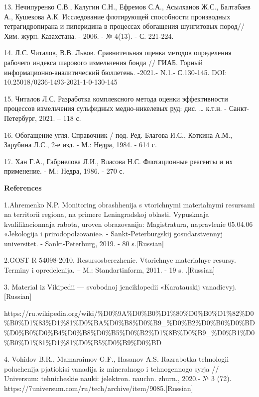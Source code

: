 13. Нечипуренко С.В., Калугин С.Н., Ефремов С.А., Асылханов Ж.С.,
Балтабаев А., Кушекова А.К. Исследование флотирующей способности
производных тетрагидропирана и пиперидина в процессах обогащения
шунгитовых пород// Хим. журн. Казахстана. - 2006. - № 4(13). - С.
221-224.

14. Л.С. Читалов, В.В. Львов. Сравнительная оценка методов определения
рабочего индекса шарового измельчения бонда // ГИАБ. Горный
информационно-аналитический бюллетень. -2021.- N.1.- С.130-145. DOI:
10.25018/0236-1493-2021-1-0-130-145

15. Читалов Л.С. Разработка комплексного метода оценки эффективности
процессов измельчения сульфидных медно-никелевых руд: дис. \ldots{}
к.т.н. - Санкт-Петербург, 2021. -- 118 с.

16. Обогащение угля. Справочник / под. Ред. Благова И.С., Коткина А.М.,
Зарубина Л.С., 2-е изд. - М.: Недра, 1984. - 614 с.

17. Хан Г.А., Габриелова Л.И., Власова Н.С. Флотационные реагенты и их
применение. - М.: Недра, 1986. - 270 с.

\textbf{References}

1.Ahremenko N.P. Monitoring obrashhenija s vtorichnymi
material\textquotesingle nymi resursami na territorii regiona, na
primere Leningradskoj oblasti. Vypusknaja kvalifikacionnaja rabota,
uroven\textquotesingle{} obrazovanija: Magistratura, napravlenie
05.04.06 «Jekologija i prirodopol\textquotesingle zovanie». -
Sankt-Peterburgskij gosudarstvennyj universitet. - Sankt-Peterburg,
2019. - 80 s.{[}Russian{]}

2.GOST R 54098-2010. Resursosberezhenie. Vtorichnye
material\textquotesingle nye resursy. Terminy i opredelenija. -- M.:
Standartinform, 2011. - 19 s. .{[}Russian{]}

3. Material iz Vikipedii --- svobodnoj jenciklopedii «Karatauskij
vanadievyj.{[}Russian{]}

https://ru.wikipedia.org/wiki/\%D0\%9A\%D0\%B0\%D1\%80\%D0\%B0\%D1\%82\%D0\%B0\%D1\%83\%D1\%81\%D0\%BA\%D0\%B8\%D0\%B9\_\%D0\%B2\%D0\%B0\%D0\%BD\%D0\%B0\%D0\%B4\%D0\%B8\%D0\%B5\%D0\%B2\%D1\%8B\%D0\%B9\_\%D0\%B1\%D0\%B0\%D1\%81\%D1\%81\%D0\%B5\%D0\%B9\%D0\%BD

4. Vohidov B.R., Mamaraimov G.F., Hasanov A.S. Razrabotka tehnologii
poluchenija pjatiokisi vanadija iz mineral\textquotesingle nogo i
tehnogennogo syr\textquotesingle ja // Universum: tehnicheskie nauki:
jelektron. nauchn. zhurn., 2020.- № 3 (72).
https://7universum.com/ru/tech/archive/item/9085.{[}Russian{]}

